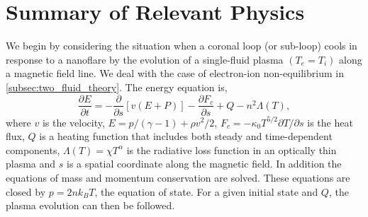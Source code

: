 \documentclass[apj]{emulateapj}
\begin{document}
	\section{Summary of Relevant Physics}
	\label{sec:phys_sum}
	\par We begin by considering the situation when a coronal loop (or sub-loop) cools in response to a nanoflare by the evolution of a single-fluid plasma $(T_e = T_i)$ along a magnetic field line. We deal with the case of electron-ion non-equilibrium in  \autoref{subsec:two_fluid_theory}. The energy equation is,
	\begin{equation}
		\label{eq:energy_1d}
		\frac{\partial E}{\partial t} = -\frac{\partial}{\partial s}[v(E+P)] - \frac{\partial F_c}{\partial s} + Q - n^2\Lambda(T),
	\end{equation}
where $v$ is the velocity, $E=p/(\gamma -1) + \rho v^2/2$, $F_c=-\kappa_0 T^{5/2}\partial T/\partial s$ is the heat flux, $Q$ is a heating function that includes both steady and time-dependent components, $\Lambda(T)=\chi T^{\alpha}$ is the radiative loss function in an optically thin plasma \citep[e.g.][]{klimchuk_highly_2008} and $s$ is a spatial coordinate along the magnetic field. In addition the equations of mass and momentum conservation are solved. These equations are closed by $p=2nk_BT$, the equation of state. For a given initial state and $Q$, the plasma evolution can then be followed. 
\end{document}

